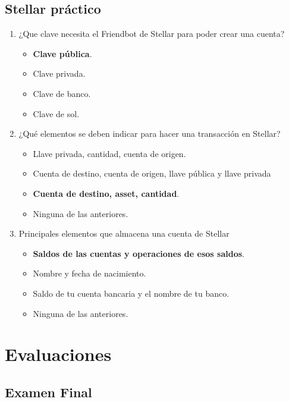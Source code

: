 \documentclass[a4paper,12pt]{/home/armando/Documentos/Cursos/LaTeX/Plantillas/lib/pub}
\begin{document}
	\subsection{Stellar práctico}
	\begin{enumerate}
		\item  ¿Que clave necesita el Friendbot de Stellar para poder crear una cuenta?
		\begin{itemize}
			\item \textbf{Clave pública}.
			\item Clave privada.
			\item Clave de banco.
			\item Clave de sol.
		\end{itemize}
	\item  ¿Qué elementos se deben indicar para hacer una transacción en Stellar?
	\begin{itemize}
		\item Llave privada, cantidad, cuenta de origen.
		\item Cuenta de destino, cuenta de origen, llave pública y llave privada
		\item \textbf{Cuenta de destino, asset, cantidad}.
		\item Ninguna de las anteriores.
	\end{itemize}
	\item Principales elementos que almacena una cuenta de Stellar
	\begin{itemize}
		\item \textbf{Saldos de las cuentas y operaciones de esos saldos}.
		\item Nombre y fecha de nacimiento.
		\item Saldo de tu cuenta bancaria y el nombre de tu banco.
		\item Ninguna de las anteriores.
	\end{itemize}
	\end{enumerate}
\section{Evaluaciones}
	\subsection{Examen Final}
\end{document}
